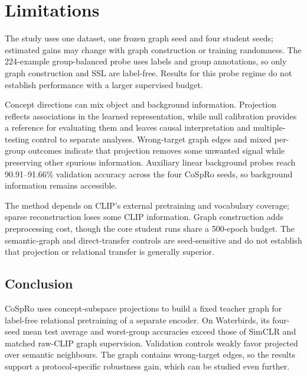 \documentclass{article}
\begin{document}
\section{Limitations}
The study uses one dataset, one frozen graph seed and four student seeds; estimated gains may change with graph construction or training randomness. The 224-example group-balanced probe uses labels and group annotations, so only graph construction and SSL are label-free. Results for this probe regime do not establish performance with a larger supervised budget.

Concept directions can mix object and background information. Projection reflects associations in the learned representation, while null calibration provides a reference for evaluating them and leaves causal interpretation and multiple-testing control to separate analyses. Wrong-target graph edges and mixed per-group outcomes indicate that projection removes some unwanted signal while preserving other spurious information. Auxiliary linear background probes reach 90.91--91.66\% validation accuracy across the four CoSpRo seeds, so background information remains accessible.

The method depends on CLIP's external pretraining and vocabulary coverage; sparse reconstruction loses some CLIP information. Graph construction adds preprocessing cost, though the core student runs share a 500-epoch budget. The semantic-graph and direct-transfer controls are seed-sensitive and do not establish that projection or relational transfer is generally superior.

\begin{samepage}
\section{Conclusion}
CoSpRo uses concept-subspace projections to build a fixed teacher graph for label-free relational pretraining of a separate encoder. On Waterbirds, its four-seed mean test average and worst-group accuracies exceed those of SimCLR and matched raw-CLIP graph supervision. Validation controls weakly favor projected over semantic neighbours. The graph contains wrong-target edges, so the results support a protocol-specific robustness gain, which can be studied even further.
\end{samepage}
\end{document}
